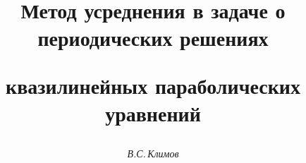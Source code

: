 

 


%


\newcommand{\up}[1]{\overset{\,\circ}{#1}{}} 


\newcommand{\ind}{\operatorname{ind}} 


\newcommand{\mes}{\operatorname{mes}} 


\newcommand{\Div}{\operatorname{div}} 


\newcommand{\la}{\langle} 


\newcommand{\ra}{\rangle} 


\newcommand{\tts}[1]{} 


 




\setcounter{page}{39} 












 


\author{\it В.С.\,Климов} 




\title{Метод усреднения в задаче о периодических решениях  


квазилинейных параболических уравнений} 


 


\date{} 




\pagestyle{plain} %


 




